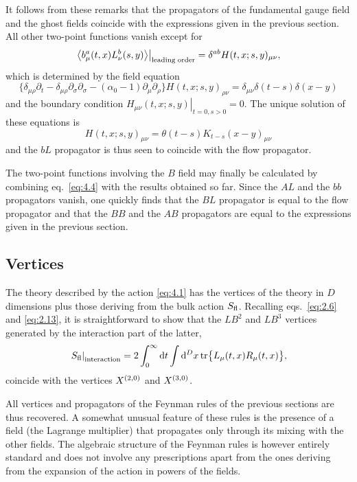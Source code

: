 It follows from these remarks that the propagators of
the fundamental gauge field and the ghost fields
coincide with the expressions given in the previous section.
All other two-point functions vanish except for
\begin{equation}
   \left.\bigl\langle
   b^a_{\mu}(t,x)L^b_{\nu}(s,y)
   \bigr\rangle\right|_{\rm leading\;order}
   =\delta^{ab}H(t,x;s,y)_{\mu\nu},
   \label{eq:4.5}
\end{equation}
which is determined by the field equation
\begin{equation}
   \bigl\{\delta_{\mu\rho}\partial_t-
   \delta_{\mu\rho}\partial_{\sigma}\partial_{\sigma}
   -(\alpha_0-1)\partial_{\mu}\partial_{\rho}\bigr\}
   H(t,x;s,y)_{\rho\nu}=\delta_{\mu\nu}\delta(t-s)\delta(x-y)
   \label{eq:4.6}
\end{equation}
and the boundary condition $\left.H_{\mu\nu}(t,x;s,y)\right|_{t=0,s>0}=0$.
The unique solution of these equations is
\begin{equation}
   H(t,x;s,y)_{\mu\nu}=\theta(t-s)K_{t-s}(x-y)_{\mu\nu}
   \label{eq:4.7}
\end{equation}
and the $bL$ propagator is thus seen to coincide with the flow
propagator.

The two-point functions involving the $B$ field
may finally be calculated by combining eq.~\eqref{eq:4.4} with the results
obtained so far. Since the $AL$ and the $bb$ propagators vanish, one
quickly finds that the $BL$ propagator is equal to the flow propagator
and that the $BB$ and the $AB$ propagators are
equal to the expressions given in the previous section.

\subsection{Vertices}

The theory described by the action \eqref{eq:4.1} has the vertices of the
theory in $D$ dimensions plus those deriving from the bulk action
$S_{\mathrm{fl}}$. Recalling eqs.~\eqref{eq:2.6} and \eqref{eq:2.13}, it is straightforward to show that
the $LB^2$ and $LB^3$ vertices generated by
the interaction part of the latter,
\begin{equation}
   \left.S_{\mathrm{fl}}\right|_{\rm interaction}=
   2\int_0^{\infty}\mathrm{d} t\int\mathrm{d}^Dx\,
   \mathrm{tr}\bigl\{L_{\mu}(t,x)R_{\mu}(t,x)\bigr\},
   \label{eq:4.8}
\end{equation}
coincide with the vertices $X^{(2,0)}$ and $X^{(3,0)}$.

All vertices and propagators of the
Feynman rules of the previous sections are thus recovered.
A somewhat unusual feature of these rules is the presence
of a field (the Lagrange multiplier) that propagates
only through its mixing with the other fields.
The algebraic structure of the Feynman rules
is however entirely standard and does not involve any
prescriptions apart from the ones deriving from the expansion of
the action in powers of the fields.

